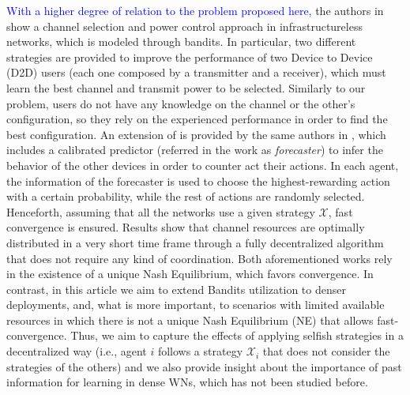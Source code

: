 \documentclass[10pt,journal,compsoc]{IEEEtran}
\newcommand{\francesc}[1]{\textcolor{blue}{#1}}
\begin{document}
	\francesc{With a higher degree of relation to the problem proposed here,} the authors in \cite{maghsudi2015joint} show a channel selection and power control approach in infrastructureless networks, which is modeled through bandits. In particular, two different strategies are provided to improve the performance of two Device to Device (D2D) users (each one composed by a transmitter and a receiver), which must learn the best channel and transmit power to be selected. Similarly to our problem, users do not have any knowledge on the channel or the other's configuration, so they rely on the experienced performance in order to find the best configuration. An extension of \cite{maghsudi2015joint} is provided by the same authors in \cite{maghsudi2015channel}, which includes a calibrated predictor (referred in the work as \textit{forecaster}) to infer the behavior of the other devices in order to counter act their actions. In each agent, the information of the forecaster is used to choose the highest-rewarding action with a certain probability, while the rest of actions are randomly selected. Henceforth, assuming that all the networks use a given strategy $\mathcal{X}$, fast convergence is ensured. Results show that channel resources are optimally distributed in a very short time frame through a fully decentralized algorithm that does not require any kind of coordination. Both aforementioned works rely in the existence of a unique Nash Equilibrium, which favors convergence. In contrast, in this article we aim to extend Bandits utilization to denser deployments, and, what is more important, to scenarios with limited available resources in which there is not a unique Nash Equilibrium (NE) that allows fast-convergence. Thus, we aim to capture the effects of applying selfish strategies in a decentralized way (i.e., agent $i$ follows a strategy $\mathcal{X}_i$ that does not consider the strategies of the others) and we also provide insight about the importance of past information for learning in dense WNs, which has not been studied before.
	
\end{document}
